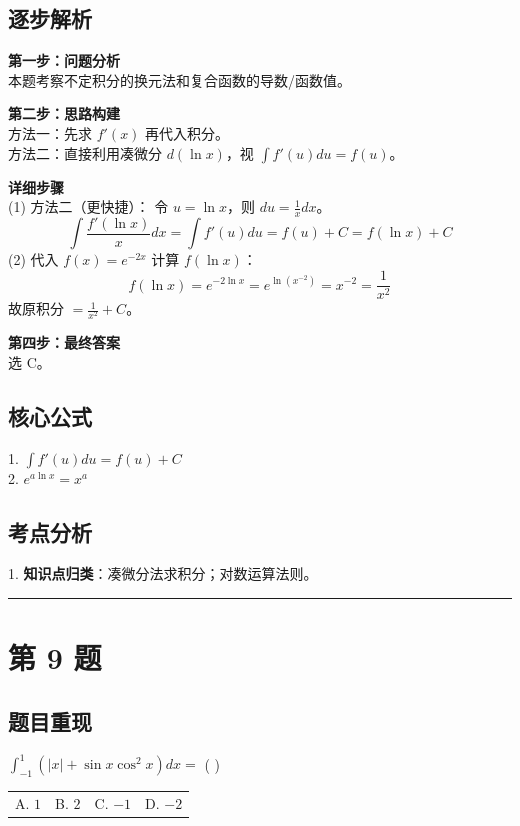 \documentclass[10pt, a4paper]{ctexart}
\newcommand{\problemheader}{
    \vspace{0.5cm}
    \noindent\rule[0.5ex]{\linewidth}{2pt} %
}
\newcommand{\analysisheader}{
    \vspace{0.2cm}
    \noindent{\color{red}\rule[0.5ex]{\linewidth}{0.5pt}} %
    \vspace{0.1cm}
}
\begin{document}
\analysisheader
{\color{red}
\subsection*{逐步解析}
\textbf{第一步：问题分析} \\
本题考察不定积分的换元法和复合函数的导数/函数值。

\textbf{第二步：思路构建} \\
方法一：先求 $f'(x)$ 再代入积分。 \\
方法二：直接利用凑微分 $d(\ln x)$，视 $\int f'(u) du = f(u)$。

\textbf{详细步骤} \\
(1) 方法二（更快捷）：
令 $u = \ln x$，则 $du = \frac{1}{x} dx$。
\[ \int \frac{f'(\ln x)}{x} dx = \int f'(u) du = f(u) + C = f(\ln x) + C \]
(2) 代入 $f(x) = e^{-2x}$ 计算 $f(\ln x)$：
\[ f(\ln x) = e^{-2 \ln x} = e^{\ln (x^{-2})} = x^{-2} = \frac{1}{x^2} \]
故原积分 $= \frac{1}{x^2} + C$。

\textbf{第四步：最终答案} \\
选 C。

\subsection*{核心公式}
1. $\int f'(u) du = f(u) + C$ \\
2. $e^{a \ln x} = x^a$

\subsection*{考点分析}
1. \textbf{知识点归类}：凑微分法求积分；对数运算法则。
}

\problemheader
\section*{第 9 题}
\subsection*{题目重现}
$\int_{-1}^{1} (|x| + \sin x \cos^2 x) dx =$ ( \quad ) \\
\begin{tabularx}{\linewidth}{@{} *{4}{X} @{}}
    A. $1$ & B. $2$ & C. $-1$ & D. $-2$
\end{tabularx}
\end{document}
